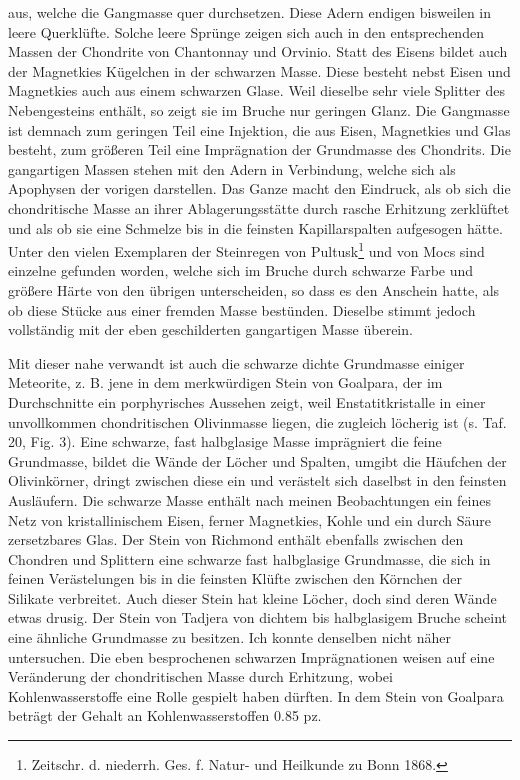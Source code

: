 \documentclass[a4paper, 12pt, oneside]{article}
\begin{document}
aus, welche die Gangmasse quer durchsetzen. Diese Adern endigen bisweilen in leere Querklüfte. Solche leere Sprünge zeigen sich auch in den entsprechenden Massen der Chondrite von Chantonnay und Orvinio. Statt des Eisens bildet auch der Magnetkies Kügelchen in der schwarzen Masse. Diese besteht nebst Eisen und Magnetkies auch aus einem schwarzen Glase. Weil dieselbe sehr viele Splitter des Nebengesteins enthält, so zeigt sie im Bruche nur geringen Glanz. Die Gangmasse ist demnach zum geringen Teil eine Injektion, die aus Eisen, Magnetkies und Glas besteht, zum größeren Teil eine Imprägnation der Grundmasse des Chondrits. Die gangartigen Massen stehen mit den Adern in Verbindung, welche sich als Apophysen der vorigen darstellen. Das Ganze macht den Eindruck, als ob sich die chondritische Masse an ihrer Ablagerungsstätte durch rasche Erhitzung zerklüftet und als ob sie eine Schmelze bis in die feinsten Kapillarspalten aufgesogen hätte. Unter den vielen Exemplaren der Steinregen von Pultusk\footnote{Zeitschr. d. niederrh. Ges. f. Natur- und Heilkunde zu Bonn 1868.} und von Mocs sind einzelne gefunden worden, welche sich im Bruche durch schwarze Farbe und größere Härte von den übrigen unterscheiden, so dass es den Anschein hatte, als ob diese Stücke aus einer fremden Masse bestünden. Dieselbe stimmt jedoch vollständig mit der eben geschilderten gangartigen Masse überein.

Mit dieser nahe verwandt ist auch die schwarze dichte Grundmasse einiger Meteorite, z. B. jene in dem merkwürdigen Stein von Goalpara, der im Durchschnitte ein porphyrisches Aussehen zeigt, weil Enstatitkristalle in einer unvollkommen chondritischen Olivinmasse liegen, die zugleich löcherig ist (s. Taf. 20, Fig. 3). Eine schwarze, fast halbglasige Masse imprägniert die feine Grundmasse, bildet die Wände der Löcher und Spalten, umgibt die Häufchen der Olivinkörner, dringt zwischen diese ein und verästelt sich daselbst in den feinsten Ausläufern. Die schwarze Masse enthält nach meinen Beobachtungen ein feines Netz von kristallinischem Eisen, ferner Magnetkies, Kohle und ein durch Säure zersetzbares Glas. Der Stein von Richmond enthält ebenfalls zwischen den Chondren und Splittern eine schwarze fast halbglasige Grundmasse, die sich in feinen Verästelungen bis in die feinsten Klüfte zwischen den Körnchen der Silikate verbreitet. Auch dieser Stein hat kleine Löcher, doch sind deren Wände etwas drusig. Der Stein von Tadjera von dichtem bis halbglasigem Bruche scheint eine ähnliche Grundmasse zu besitzen. Ich konnte denselben nicht näher untersuchen. Die eben besprochenen schwarzen Imprägnationen weisen auf eine Veränderung der chondritischen Masse durch Erhitzung, wobei Kohlenwasserstoffe eine Rolle gespielt haben dürften. In dem Stein von Goalpara beträgt der Gehalt an Kohlenwasserstoffen 0.85 pz.
\end{document}
